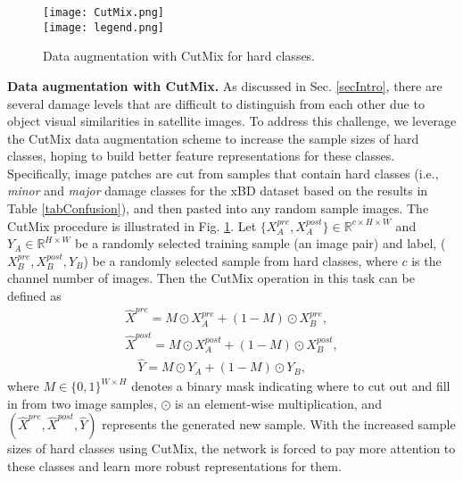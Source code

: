 \documentclass{article}
\begin{document}
\begin{figure}
  \centering
  \texttt{[image: CutMix.png]} \\
   \texttt{[image: legend.png]}
  \caption{Data augmentation with CutMix for hard classes.}
  \vspace{-0.1cm}
  \label{figCutmix}
\end{figure}

\textbf{Data augmentation with CutMix.} 
As discussed in Sec. \ref{secIntro}, there are several damage levels that are difficult to distinguish from each other due to object visual similarities in satellite images. To address this challenge, we leverage the CutMix data augmentation scheme to increase the sample sizes of hard classes, hoping to build better feature representations for these classes.  
Specifically, image patches are cut from samples that contain hard classes (i.e., \textit{minor} and \textit{major} damage classes for the xBD dataset based on the results in Table \ref{tabConfusion}), and then pasted into any random sample images. The CutMix procedure is illustrated in Fig. \ref{figCutmix}. Let $\{X_A^{pre}, X_A^{post}\}  \in \mathbb{R}^{c\times H\times W}$ and $Y_A \in \mathbb{R}^{H\times W}$ be a randomly selected training sample (an image pair) and label, ($X_B^{pre}, X_B^{post}, Y_B$) be a randomly selected sample from hard classes, where $c$ is the channel number of images. Then the CutMix operation in this task can be defined as
\begin{equation}
\begin{aligned}
\hat{X}^{pre} = M\odot X_A^{pre} + (1-M) \odot X_B^{pre} , \\
\hat{X}^{post} = M\odot X_A^{post} + (1-M) \odot X_B^{post},\\
\quad \hat{Y} = M\odot Y_A + (1-M) \odot Y_B,  
\end{aligned}
\label{eqConv1}
\end{equation}
where $M\in \{ 0,1\}^{W\times H}$ denotes a binary mask indicating where to cut out and fill in from two image samples, $\odot$ is an element-wise multiplication, and $(\hat{X}^{pre}, \hat{X}^{post}, \hat{Y})$ represents the generated new sample. With the increased sample sizes of hard classes using CutMix, the network is forced to pay more attention to these classes and learn more robust representations for them.
\end{document}
